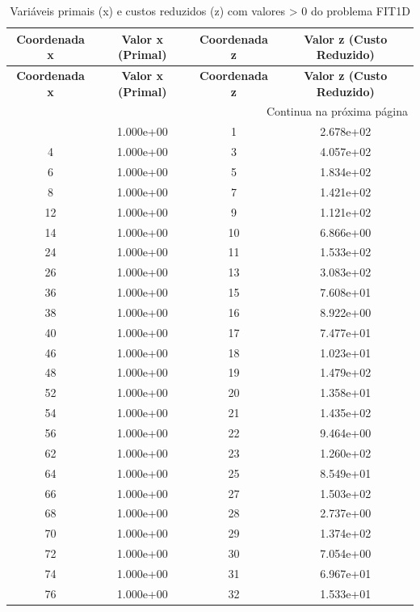 \documentclass[12pt]{article}
\begin{document}
\begin{longtable}{@{}cccc@{}}
\caption{Variáveis primais (x) e custos reduzidos (z) com valores > 0 do problema FIT1D} \\
\toprule
\textbf{Coordenada x} & \textbf{Valor x (Primal)} & \textbf{Coordenada z} & \textbf{Valor z (Custo Reduzido)} \\
\midrule
\endfirsthead

\toprule
\textbf{Coordenada x} & \textbf{Valor x (Primal)} & \textbf{Coordenada z} & \textbf{Valor z (Custo Reduzido)} \\
\midrule
\endhead

\midrule \multicolumn{4}{r}{{Continua na próxima página}} \\ \midrule
\endfoot

\bottomrule
\endlastfoot
2 & 1.000e+00 & 1 & 2.678e+02 \\
4 & 1.000e+00 & 3 & 4.057e+02 \\
6 & 1.000e+00 & 5 & 1.834e+02 \\
8 & 1.000e+00 & 7 & 1.421e+02 \\
12 & 1.000e+00 & 9 & 1.121e+02 \\
14 & 1.000e+00 & 10 & 6.866e+00 \\
24 & 1.000e+00 & 11 & 1.533e+02 \\
26 & 1.000e+00 & 13 & 3.083e+02 \\
36 & 1.000e+00 & 15 & 7.608e+01 \\
38 & 1.000e+00 & 16 & 8.922e+00 \\
40 & 1.000e+00 & 17 & 7.477e+01 \\
46 & 1.000e+00 & 18 & 1.023e+01 \\
48 & 1.000e+00 & 19 & 1.479e+02 \\
52 & 1.000e+00 & 20 & 1.358e+01 \\
54 & 1.000e+00 & 21 & 1.435e+02 \\
56 & 1.000e+00 & 22 & 9.464e+00 \\
62 & 1.000e+00 & 23 & 1.260e+02 \\
64 & 1.000e+00 & 25 & 8.549e+01 \\
66 & 1.000e+00 & 27 & 1.503e+02 \\
68 & 1.000e+00 & 28 & 2.737e+00 \\
70 & 1.000e+00 & 29 & 1.374e+02 \\
72 & 1.000e+00 & 30 & 7.054e+00 \\
74 & 1.000e+00 & 31 & 6.967e+01 \\
76 & 1.000e+00 & 32 & 1.533e+01 \\

\end{longtable}
\end{document}

